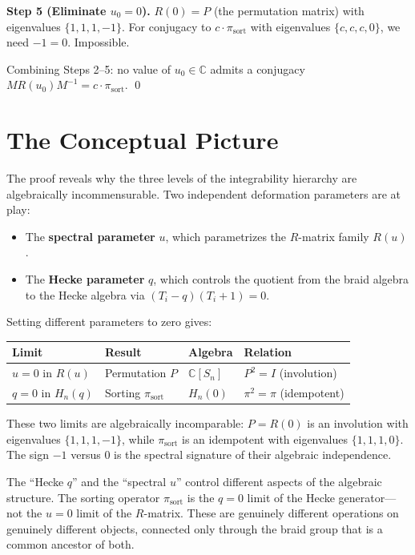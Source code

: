 \documentclass[11pt]{article}
\theoremstyle{remark}
\newcommand{\CC}{\mathbb{C}}
\newcommand{\pisort}{\pi_{\mathrm{sort}}}
\begin{document}
\textbf{Step 5 (Eliminate $u_0 = 0$).}
$R(0) = P$ (the permutation matrix) with eigenvalues $\{1,1,1,-1\}$.
For conjugacy to $c \cdot \pisort$ with eigenvalues $\{c,c,c,0\}$, we
need $-1 = 0$. Impossible.

\medskip

Combining Steps 2--5: no value of $u_0 \in \CC$ admits a conjugacy
$M R(u_0) M^{-1} = c \cdot \pisort$. \qed

\section{The Conceptual Picture}

The proof reveals why the three levels of the integrability hierarchy are
algebraically incommensurable. Two independent deformation parameters
are at play:
\begin{itemize}
  \item The \textbf{spectral parameter} $u$, which parametrizes the
    $R$-matrix family $R(u)$.
  \item The \textbf{Hecke parameter} $q$, which controls the quotient
    from the braid algebra to the Hecke algebra via
    $(T_i - q)(T_i + 1) = 0$.
\end{itemize}

Setting different parameters to zero gives:

\begin{center}
\begin{tabular}{@{}llll@{}}
  \toprule
  Limit & Result & Algebra & Relation \\
  \midrule
  $u = 0$ in $R(u)$ & Permutation $P$ & $\CC[S_n]$ &
    $P^2 = I$ (involution) \\
  $q = 0$ in $H_n(q)$ & Sorting $\pisort$ & $H_n(0)$ &
    $\pi^2 = \pi$ (idempotent) \\
  \bottomrule
\end{tabular}
\end{center}

These two limits are algebraically incomparable: $P = R(0)$ is an
involution with eigenvalues $\{1,1,1,-1\}$, while $\pisort$ is an
idempotent with eigenvalues $\{1,1,1,0\}$. The sign $-1$ versus $0$
is the spectral signature of their algebraic independence.

The ``Hecke $q$'' and the ``spectral $u$'' control different aspects of
the algebraic structure. The sorting operator $\pisort$ is the $q = 0$
limit of the Hecke generator---not the $u = 0$ limit of the $R$-matrix.
These are genuinely different operations on genuinely different objects,
connected only through the braid group that is a common ancestor of both.
\end{document}
